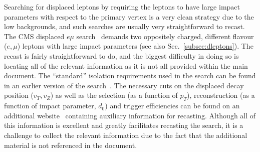 Searching for displaced leptons by requiring the leptons to have large impact parameters with respect to the primary vertex is a very clean strategy due to the low backgrounds, and such searches are usually very straightforward to recast.
The CMS displaced $e\mu$ search~\cite{Khachatryan:2014mea} demands two
oppositely charged, different flavour ($e, \mu$) leptons with large impact
parameters (see also Sec.~\ref{subsec:dleptons}). The recast is fairly straightforward to do, and the biggest difficulty
in doing so is locating all of the relevant information as it is not all
provided within the main document. The ``standard'' isolation requirements used
in the search can be found in an earlier version of the
search~\cite{CMS:2014bra}.
The necessary cuts on the displaced decay position ($v_{T},v_{Z}$) as well as
the selection (as a function of $p_T$), reconstruction (as a function
of impact parameter, $d_0$) and trigger efficiencies can be found on an
additional website~\cite{CMSemuEfficiency} containing auxiliary information for
recasting. Although all of this information is excellent and greatly
facilitates recasting the search, it is a challenge to collect the relevant information
due to the fact that the additional material is not
referenced in the document.

